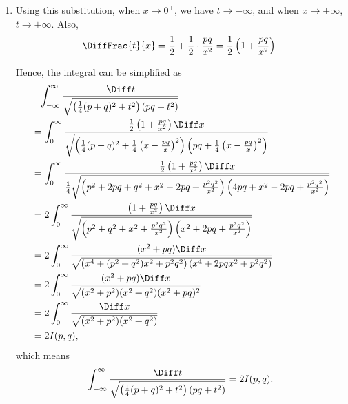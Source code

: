 \begin{enumerate}
    \item Using this substitution, when \(x \to 0^{+}\), we have \(t \to -\infty\), and when \(x \to +\infty\), \(t \to +\infty\). Also,
          \[
              \DiffFrac{t}{x} = \frac{1}{2} + \frac{1}{2} \cdot \frac{pq}{x^2} = \frac{1}{2} \left(1 + \frac{pq}{x^2}\right).
          \]

          Hence, the integral can be simplified as
          \begin{align*}
               & \phantom{=} \int_{-\infty}^{\infty} \frac{\Diff t}{\sqrt{\left(\frac{1}{4} (p + q)^2 + t^2\right) \left(pq + t^2\right)}}                                                                                                             \\
               & = \int_{0}^{\infty} \frac{\frac{1}{2} \left(1 + \frac{pq}{x^2}\right) \Diff x}{\sqrt{\left(\frac{1}{4} (p + q)^2 + \frac{1}{4} \left(x - \frac{pq}{x}\right)^2\right) \left(pq + \frac{1}{4} \left(x - \frac{pq}{x}\right)^2\right)}} \\
               & = \int_{0}^{\infty} \frac{\frac{1}{2} \left(1 + \frac{pq}{x^2}\right) \Diff x}{\frac{1}{4} \sqrt{\left(p^2 + 2pq + q^2 + x^2 - 2pq + \frac{p^2 q^2}{x^2}\right) \left(4pq + x^2 - 2pq + \frac{p^2 q^2}{x^2}\right)}}                  \\
               & = 2 \int_{0}^{\infty} \frac{\left(1 + \frac{pq}{x^2}\right) \Diff x}{\sqrt{\left(p^2 + q^2 + x^2 + \frac{p^2 q^2}{x^2}\right) \left(x^2 + 2pq + \frac{p^2 q^2}{x^2}\right)}}                                                          \\
               & = 2 \int_{0}^{\infty} \frac{(x^2 + pq) \Diff x}{\sqrt{\left(x^4 + (p^2 + q^2) x^2 + p^2 q^2\right)\left(x^4 + 2pq x^2 + p^2 q^2\right)}}                                                                                              \\
               & = 2 \int_{0}^{\infty} \frac{(x^2 + pq) \Diff x}{\sqrt{(x^2 + p^2) (x^2 + q^2) (x^2 + pq)^2}}                                                                                                                                          \\
               & = 2 \int_{0}^{\infty} \frac{\Diff x}{\sqrt{(x^2 + p^2) (x^2 + q^2)}}                                                                                                                                                                  \\
               & = 2 I(p, q),
          \end{align*}
          which means
          \[
              \int_{-\infty}^{\infty} \frac{\Diff t}{\sqrt{\left(\frac{1}{4} (p + q)^2 + t^2\right) \left(pq + t^2\right)}} = 2 I(p, q).
          \]


\end{enumerate}
